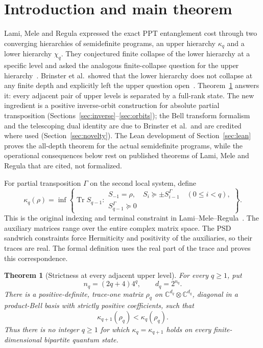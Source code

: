 \documentclass[11pt]{article}
\newtheorem{theorem}{Theorem}
\newcommand{\Tr}{\operatorname{Tr}}
\newcommand{\C}{\mathbb C}
\begin{document}
\section{Introduction and main theorem}
Lami, Mele and Regula expressed the exact PPT entanglement cost through two
converging hierarchies of semidefinite programs, an upper hierarchy
$\kappa_q$ and a lower hierarchy $\chi_q$. They conjectured finite collapse of
the lower hierarchy at a specific level and asked the analogous
finite-collapse question for the upper hierarchy~\cite{LMR}. Brinster et al.\ showed that the lower hierarchy
does not collapse at any finite depth and explicitly left the upper question
open~\cite{Brinster}. Theorem~\ref{thm:main} answers it: every adjacent pair of
upper levels is separated by a full-rank state. The new ingredient is a
positive inverse-orbit construction for absolute partial transposition
(Sections~\ref{sec:inverse}--\ref{sec:orbits}); the Bell transform formalism
and the telescoping dual identity are due to Brinster et al.\ and are credited
where used (Section~\ref{sec:novelty}). The Lean development of
Section~\ref{sec:lean} proves the all-depth theorem for the actual
semidefinite programs, while the operational consequences below rest on
published theorems of Lami, Mele and Regula that are cited, not formalized.

For partial transposition $\Gamma$ on the second local system, define
\begin{equation}\label{eq:kappa}
\kappa_q(\rho)=\inf\left\{\Tr S_{q-1}:\begin{array}{l}
S_{-1}=\rho,\quad S_i\succeq\pm S_{i-1}^{\Gamma}\quad(0\le i<q),\\
S_{q-1}^{\Gamma}\succeq0
\end{array}\right\}.
\end{equation}
This is the original indexing and terminal constraint in
Lami--Mele--Regula~\cite{LMR}. The auxiliary matrices range over the entire
complex matrix space. The PSD sandwich constraints force Hermiticity and
positivity of the auxiliaries, so their traces are real. The formal definition
uses the real part of the trace and proves this correspondence.

\begin{theorem}[Strictness at every adjacent upper level]\label{thm:main}
For every $q\ge1$, put
\[
n_q=(2q+4)4^q,\qquad d_q=2^{n_q}.
\]
There is a positive-definite, trace-one matrix $\rho_q$ on
$\C^{d_q}\otimes\C^{d_q}$, diagonal in a product-Bell basis with strictly
positive coefficients, such that
\begin{equation}\label{eq:main}
\kappa_{q+1}(\rho_q)<\kappa_q(\rho_q).
\end{equation}
Thus there is no integer $q\ge1$ for which $\kappa_q=\kappa_{q+1}$ holds
on every finite-dimensional bipartite quantum state.
\end{theorem}
\end{document}
